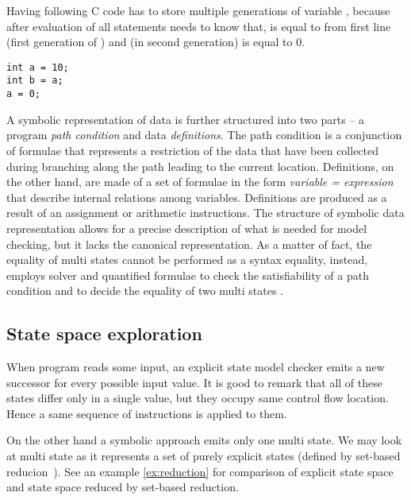 
\begin{example}\label{ex:gen}
Having following C code \SymDIVINE has to store multiple generations of variable
, because after evaluation of all statements \SymDIVINE needs to know
that,  is equal to  from first line (first generation of
) and  (in second generation) is equal to $0$.

\begin{verbatim}
int a = 10;
int b = a;
a = 0;
\end{verbatim}

\end{example}

A symbolic representation of data is further structured into two parts -- a
program \emph{path condition} and data \emph{definitions}. The path condition is a
conjunction of formulae that represents a restriction of the data that have been
collected during branching along the path leading to the current location.
Definitions, on the other hand, are made of a set of formulae in the form
\emph{variable = expression} that describe internal relations among variables.
Definitions are produced as a result of an assignment or arithmetic
instructions. The structure of symbolic data representation allows for a
precise description of what is needed for model checking, but it lacks the
canonical representation. As a matter of fact, the equality of multi states
cannot be performed as a syntax equality, instead, \SymDIVINE employs \SMT
solver and quantified formulae to check the satisfiability of a path condition
and to decide the equality of two multi states \cite{Mrazek16}.

\subsection{State space exploration}

When program reads some input, an explicit state model checker emits a
new successor for every possible input value. It is good to remark that all of
these states differ only in a single value, but they occupy same control flow
location. Hence a same sequence of instructions is applied to them.


On the other hand a symbolic approach emits only one multi state. We may look at
multi state as it represents a set of purely explicit states (defined by
set-based reducion~\cite{Havel14}). See an example \ref{ex:reduction} for comparison of
explicit state space and state space reduced by set-based reduction.

